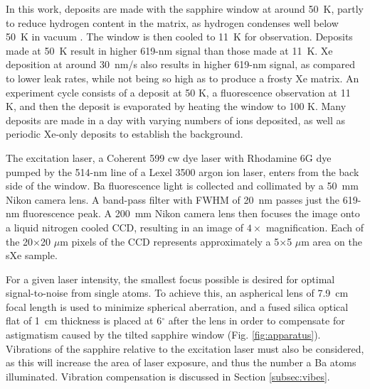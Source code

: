 \documentclass[aps,pra,reprint,superscriptaddress]{revtex4-1}
\begin{document}
In this work, deposits are made with the sapphire window at around 50~K, partly to reduce hydrogen content in the matrix, as hydrogen condenses well below 50~K in vacuum \cite{Mong2015}.  The window is then cooled to 11~K for observation.  Deposits made at 50~K result in higher 619-nm signal than those made at 11~K.  Xe deposition at around 30~nm/s also results in higher 619-nm signal, as compared to lower leak rates, while not being so high as to produce a frosty Xe matrix.  An experiment cycle consists of a deposit at 50 K, a fluorescence observation at 11 K, and then the deposit is evaporated by heating the window to 100 K.  Many deposits are made in a day with varying numbers of ions deposited, as well as periodic Xe-only deposits to establish the background.

The excitation laser, a Coherent 599 cw dye laser with Rhodamine 6G dye pumped by the 514-nm line of a Lexel 3500 argon ion laser, enters from the back side of the window.  Ba fluorescence light is collected and collimated by a 50~mm Nikon camera lens.  A band-pass filter with FWHM of 20~nm passes just the 619-nm fluorescence peak.  A 200~mm Nikon camera lens then focuses the image onto a liquid nitrogen cooled CCD, resulting in an image of $4 \times$ magnification.  Each of the 20$\times$20 $\mu$m pixels of the CCD represents approximately a 5$\times$5 $\mu$m area on the sXe sample.

For a given laser intensity, the smallest focus possible is desired for optimal signal-to-noise from single atoms.  To achieve this, an aspherical lens of 7.9~cm focal length \cite{asphere} is used to minimize spherical aberration, and a fused silica optical flat of 1~cm thickness is placed at 6$^{\circ}$ after the lens in order to compensate for astigmatism caused by the tilted sapphire window (Fig. \ref{fig:apparatus}).  Vibrations of the sapphire relative to the excitation laser must also be considered, as this will increase the area of laser exposure, and thus the number a Ba atoms illuminated.  Vibration compensation is discussed in Section \ref{subsec:vibes}. %
\end{document}
